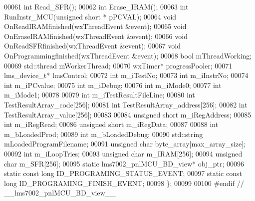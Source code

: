 \begin{DoxyCode}
00061     \textcolor{keywordtype}{int} Read_SFR();
00062     \textcolor{keywordtype}{int} Erase_IRAM();
00063     \textcolor{keywordtype}{int} RunInstr_MCU(\textcolor{keywordtype}{unsigned} \textcolor{keywordtype}{short} * pPCVAL);
00064     \textcolor{keywordtype}{void} OnReadIRAMfinished(wxThreadEvent &event);
00065     \textcolor{keywordtype}{void} OnEraseIRAMfinished(wxThreadEvent &event);
00066     \textcolor{keywordtype}{void} OnReadSFRfinished(wxThreadEvent &event);
00067     \textcolor{keywordtype}{void} OnProgrammingfinished(wxThreadEvent &event);
00068     \textcolor{keywordtype}{bool} mThreadWorking;
00069     std::thread mWorkerThread;
00070     wxTimer* progressPooler;
00071     lms_device_t* lmsControl;
00072     \textcolor{keywordtype}{int} m_iTestNo;
00073     \textcolor{keywordtype}{int} m_iInstrNo;
00074     \textcolor{keywordtype}{int} m_iPCvalue;
00075     \textcolor{keywordtype}{int} m_iDebug;
00076     \textcolor{keywordtype}{int} m_iMode0;
00077     \textcolor{keywordtype}{int} m_iMode1;
00078 
00079     \textcolor{keywordtype}{int} m_iTestResultFileLine;
00080     \textcolor{keywordtype}{int} TestResultArray_code[256];
00081     \textcolor{keywordtype}{int} TestResultArray_address[256];
00082     \textcolor{keywordtype}{int} TestResultArray_value[256];
00083 
00084     \textcolor{keywordtype}{unsigned} \textcolor{keywordtype}{short} m_iRegAddress;
00085     \textcolor{keywordtype}{int} m_iRegRead;
00086     \textcolor{keywordtype}{unsigned} \textcolor{keywordtype}{short} m_iRegData;
00087 
00088     \textcolor{keywordtype}{int} m_bLoadedProd;
00089     \textcolor{keywordtype}{int} m_bLoadedDebug;
00090     std::string mLoadedProgramFilename;
00091     \textcolor{keywordtype}{unsigned} \textcolor{keywordtype}{char} byte_array[max_array_size];
00092     \textcolor{keywordtype}{int} m_iLoopTries;
00093     \textcolor{keywordtype}{unsigned} \textcolor{keywordtype}{char} m_IRAM[256];
00094     \textcolor{keywordtype}{unsigned} \textcolor{keywordtype}{char} m_SFR[256];
00095     \textcolor{keyword}{static} lms7002_pnlMCU_BD_view* obj_ptr;
00096     \textcolor{keyword}{static} \textcolor{keyword}{const} \textcolor{keywordtype}{long} ID_PROGRAMING_STATUS_EVENT;
00097     \textcolor{keyword}{static} \textcolor{keyword}{const} \textcolor{keywordtype}{long} ID_PROGRAMING_FINISH_EVENT;
00098 \};
00099 
00100 \textcolor{preprocessor}{#endif // \_\_lms7002\_pnlMCU\_BD\_view\_\_}
\end{DoxyCode}
